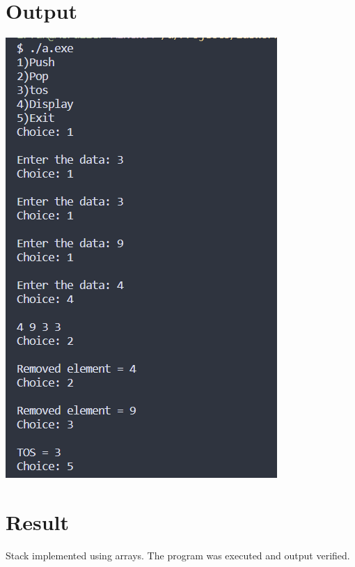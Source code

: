 \section{Output}
\includegraphics[]{Cycle_1/Outputs/Stack.png}

\section{Result}
Stack implemented using arrays. The program was executed and output verified.